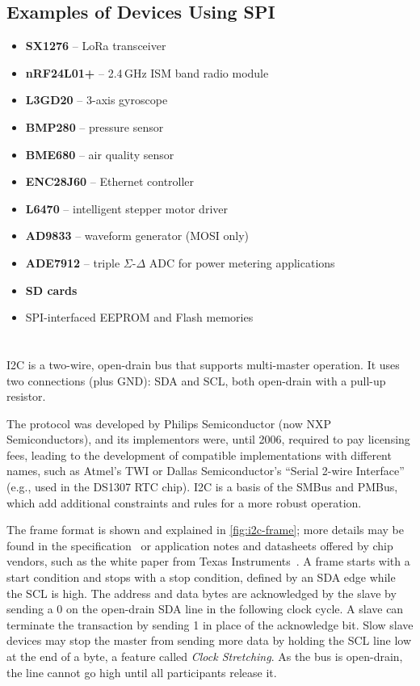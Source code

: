 \pagebreak[1] %
\subsection{Examples of Devices Using SPI}

\begin{itemize}
	\item \textbf{SX1276} -- LoRa transceiver
	\item \textbf{nRF24L01+} -- 2.4\,GHz ISM band radio module
	\item \textbf{L3GD20} -- 3-axis gyroscope
	\item \textbf{BMP280} -- pressure sensor
	\item \textbf{BME680} -- air quality sensor
	\item \textbf{ENC28J60} -- Ethernet controller
	\item \textbf{L6470} -- intelligent stepper motor driver
	\item \textbf{AD9833} -- waveform generator (\gls{MOSI} only)
	\item \textbf{ADE7912} -- triple $\Sigma$-$\Delta$ \gls{ADC} for power metering applications
	\item \textbf{SD cards}~\cite{sd-spec}
	\item SPI-interfaced EEPROM and Flash memories
\end{itemize}

\section{\texorpdfstring{\IIC}{I2C}} \label{sec:theory-i2c}

\acrfull{I2C} is a two-wire, open-drain bus that supports multi-master operation.
It uses two connections (plus \gls{GND}): \gls{SDA} and \gls{SCL}, both open-drain with a pull-up resistor.

The protocol was developed by Philips Semiconductor (now NXP Semiconductors), and its implementors were, until 2006, required to pay licensing fees, leading to the development of compatible implementations with different names, such as Atmel's \gls{TWI} or Dallas Semiconductor's ``Serial 2-wire Interface'' (e.g., used in the DS1307 \gls{RTC} chip). \gls{I2C} is a basis of the \gls{SMBus} and \gls{PMBus}, which add additional constraints and rules for a more robust operation.

The frame format is shown and explained in \cref{fig:i2c-frame}; more details may be found in the specification~\cite{i2c-spec} or application notes and datasheets offered by chip vendors, such as the white paper from Texas Instruments~\cite{understanding-i2c}. A frame starts with a start condition and stops with a stop condition, defined by an \gls{SDA} edge while the \gls{SCL} is high. The address and data bytes are acknowledged by the slave by sending a 0 on the open-drain \gls{SDA} line in the following clock cycle. A slave can terminate the transaction by sending 1 in place of the acknowledge bit. Slow slave devices may stop the master from sending more data by holding the SCL line low at the end of a byte, a feature called \textit{Clock Stretching}. As the bus is open-drain, the line cannot go high until all participants release it.

